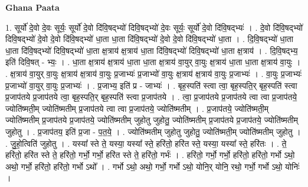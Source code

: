 \documentclass[17pt]{extarticle}
\begin{document}
\textbf{Ghana Paata } \newline

1. सूर्यो॑ दे॒वो दे॒वः सूर्यः॒ सूर्यो॑ दे॒वो दि॑वि॒षद्भ्यो॑ दिवि॒षद्भ्यो॑ दे॒वः सूर्यः॒ सूर्यो॑ दे॒वो दि॑वि॒षद्भ्यः॑ । . दे॒वो दि॑वि॒षद्भ्यो॑ दिवि॒षद्भ्यो॑ दे॒वो दे॒वो दि॑वि॒षद्भ्यो॑ धा॒ता धा॒ता दि॑वि॒षद्भ्यो॑ दे॒वो दे॒वो दि॑वि॒षद्भ्यो॑ धा॒ता । . दि॒वि॒षद्भ्यो॑ धा॒ता धा॒ता दि॑वि॒षद्भ्यो॑ दिवि॒षद्भ्यो॑ धा॒ता क्ष॒त्राय॑ क्ष॒त्राय॑ धा॒ता दि॑वि॒षद्भ्यो॑ दिवि॒षद्भ्यो॑ धा॒ता क्ष॒त्राय॑ । . दि॒वि॒षद्भ्य॒ इति॑ दिवि॒षत् - भ्यः॒ । . धा॒ता क्ष॒त्राय॑ क्ष॒त्राय॑ धा॒ता धा॒ता क्ष॒त्राय॑ वा॒युर् वा॒युः क्ष॒त्राय॑ धा॒ता धा॒ता क्ष॒त्राय॑ वा॒युः । . क्ष॒त्राय॑ वा॒युर् वा॒युः क्ष॒त्राय॑ क्ष॒त्राय॑ वा॒युः प्र॒जाभ्यः॑ प्र॒जाभ्यो॑ वा॒युः क्ष॒त्राय॑ क्ष॒त्राय॑ वा॒युः प्र॒जाभ्यः॑ । . वा॒युः प्र॒जाभ्यः॑ प्र॒जाभ्यो॑ वा॒युर् वा॒युः प्र॒जाभ्यः॑ । . प्र॒जाभ्य॒ इति॑ प्र - जाभ्यः॑ । . बृह॒स्पति॑ स्त्वा त्वा॒ बृह॒स्पति॒र् बृह॒स्पति॑ स्त्वा प्र॒जाप॑तये प्र॒जाप॑तये त्वा॒ बृह॒स्पति॒र् बृह॒स्पति॑ स्त्वा प्र॒जाप॑तये । . त्वा॒ प्र॒जाप॑तये प्र॒जाप॑तये त्वा त्वा प्र॒जाप॑तये॒ ज्योति॑ष्मती॒म् ज्योति॑ष्मतीम् प्र॒जाप॑तये त्वा त्वा प्र॒जाप॑तये॒ ज्योति॑ष्मतीम् । . प्र॒जाप॑तये॒ ज्योति॑ष्मती॒म् ज्योति॑ष्मतीम् प्र॒जाप॑तये प्र॒जाप॑तये॒ ज्योति॑ष्मतीम् जुहोतु जुहोतु॒ ज्योति॑ष्मतीम् प्र॒जाप॑तये प्र॒जाप॑तये॒ ज्योति॑ष्मतीम् जुहोतु । . प्र॒जाप॑तय॒ इति॑ प्र॒जा - प॒त॒ये॒ । . ज्योति॑ष्मतीम् जुहोतु जुहोतु॒ ज्योति॑ष्मती॒म् ज्योति॑ष्मतीम् जुहोतु । . जु॒हो॒त्विति॑ जुहोतु । . यस्या᳚ स्ते ते॒ यस्या॒ यस्या᳚ स्ते॒ हरि॑तो॒ हरि॑त स्ते॒ यस्या॒ यस्या᳚ स्ते॒ हरि॑तः । . ते॒ हरि॑तो॒ हरि॑त स्ते ते॒ हरि॑तो॒ गर्भो॒ गर्भो॒ हरि॑त स्ते ते॒ हरि॑तो॒ गर्भः॑ । . हरि॑तो॒ गर्भो॒ गर्भो॒ हरि॑तो॒ हरि॑तो॒ गर्भो ऽथो॒ अथो॒ गर्भो॒ हरि॑तो॒ हरि॑तो॒ गर्भो ऽथो᳚ । . गर्भो ऽथो॒ अथो॒ गर्भो॒ गर्भो ऽथो॒ योनि॒र् योनि॒ रथो॒ गर्भो॒ गर्भो ऽथो॒ योनिः॑ । \newline
\end{document}
